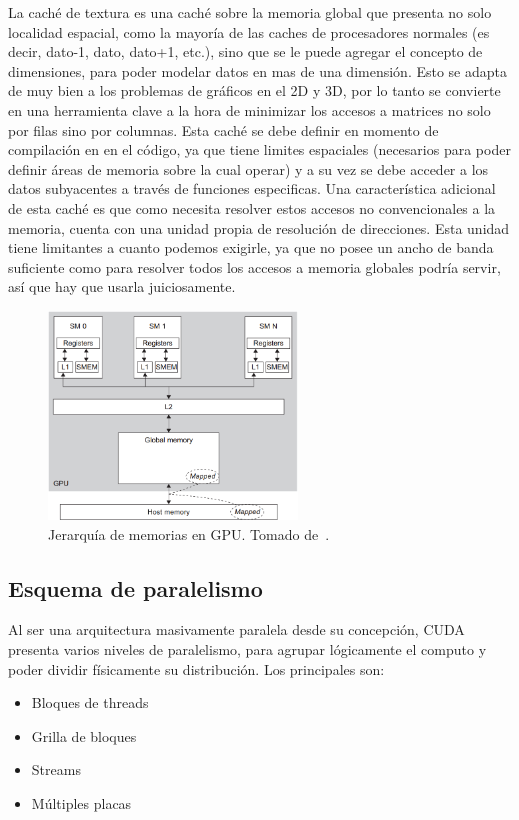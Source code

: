 La cach\'e de textura es una cach\'e sobre la memoria global que presenta no solo localidad espacial,
como la mayor\'ia de las caches de procesadores normales (es decir, dato-1, dato, dato+1, etc.), sino que se le
puede agregar el concepto de dimensiones, para poder modelar datos en mas de una dimensi\'on.
Esto se adapta de muy bien a los problemas de gr\'aficos en el 2D y 3D, por lo tanto se convierte
en una herramienta clave a la hora de minimizar los accesos a matrices
no solo por filas sino por columnas. Esta cach\'e se debe definir en momento de compilaci\'on en
en el c\'odigo, ya que tiene limites espaciales (necesarios para poder definir \'areas de memoria
sobre la cual operar) y a su vez se debe acceder a los datos subyacentes a trav\'es de funciones especificas. Una caracter\'istica adicional
de esta cach\'e es que como necesita resolver estos accesos no convencionales a la memoria, cuenta
con una unidad propia de resoluci\'on de direcciones. Esta unidad tiene limitantes a cuanto podemos
exigirle, ya que no posee un ancho de banda suficiente como para resolver todos los
accesos a memoria globales podr\'ia servir, as\'i que hay que usarla juiciosamente.

\begin{figure}[htbp]
    \centering
    \includegraphics[width=250px]{images/cuda-memories.png}
    \caption{Jerarqu\'ia de memorias en GPU. Tomado de~\cite{farberCuda}.}
    \label{fig:cuda-memories}
\end{figure}

\subsection{Esquema de paralelismo}
Al ser una arquitectura masivamente paralela desde su concepci\'on, CUDA presenta varios niveles de paralelismo, para
agrupar l\'ogicamente el computo y poder dividir f\'isicamente su distribuci\'on. Los principales son:
\begin{itemize}
  \item Bloques de threads
  \item Grilla de bloques
  \item Streams
  \item M\'ultiples placas
\end{itemize}

